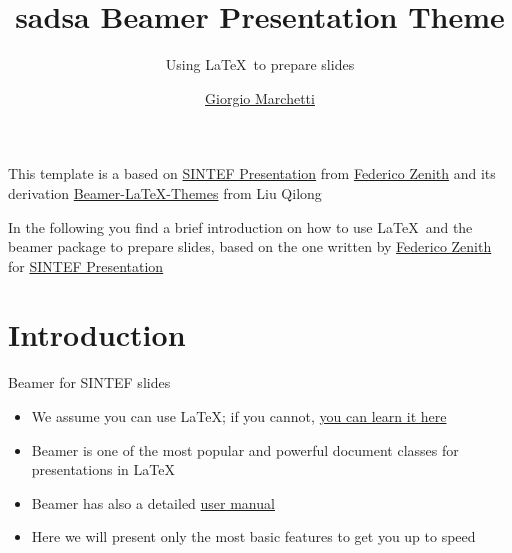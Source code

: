 \documentclass{beamer}
\title{sadsa Beamer Presentation Theme}
\subtitle{Using \LaTeX\ to prepare slides}
\author{\href{mailto:ciao@gio.im}{Giorgio Marchetti}}
\newcommand{\hrefcol}[2]{\textcolor{cyan}{\href{#1}{#2}}}
\begin{document}
\maketitle

\begin{frame}

      This template is a based on \hrefcol{https://www.overleaf.com/latex/templates/sintef-presentation/jhbhdffczpnx}{SINTEF
            Presentation} from \hrefcol{mailto:federico.zenith@sintef.no}{Federico Zenith} and its derivation
      \hrefcol{https://github.com/TOB-KNPOB/Beamer-LaTeX-Themes}{Beamer-LaTeX-Themes} from Liu Qilong

      \vspace{\baselineskip}

      In the following you find a brief introduction on how to use \LaTeX\ and the beamer package to prepare slides, based on
      the one written by \hrefcol{mailto:federico.zenith@sintef.no}{Federico Zenith} for
      \hrefcol{https://www.overleaf.com/latex/templates/sintef-presentation/jhbhdffczpnx}{SINTEF Presentation}


\end{frame}

\section{Introduction}

\begin{frame}{Beamer for SINTEF slides}
      \begin{itemize}
            \item We assume you can use \LaTeX; if you cannot, \hrefcol{http://en.wikibooks.org/wiki/LaTeX/}{you can learn it here}
            \item Beamer is one of the most popular and powerful document classes for presentations in \LaTeX
            \item Beamer has also a detailed
                  \hrefcol{http://www.ctan.org/tex-archive/macros/latex/contrib/beamer/doc/beameruserguide.pdf}{user manual}
            \item Here we will present only the most basic features to get you up to speed
      \end{itemize}
\end{frame}
\end{document}
